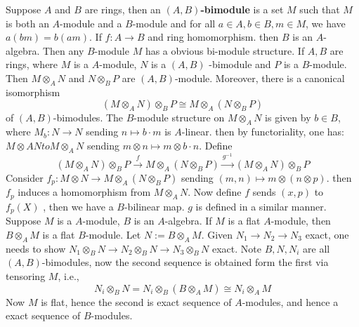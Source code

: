 \documentclass[12pt]{article}
\theoremstyle{definition}
\theoremstyle{plain}
\begin{document}
\medskip
Suppose $A$ and $B$ are rings, then an \textbf{$(A, B)$-bimodule} is a set $M$ such that $M$ is both an $A$-module and a $B$-module and for all $a\in A, b\in B, m\in M$, we have $a(bm)=b(am)$.
\Exe If $f:A\to B$ and ring homomorphism. then $B$ is an $A$-algebra. Then any $B$-module $M$ has a obvious bi-module structure.
\Lemma If $A, B$ are rings, where $M$ is a $A$-module, $N$ is a $(A, B)$ -bimodule and $P$ is a $B$-module. Then $M\otimes_A N$ and $N\otimes_B P$ are $(A, B)$-module. Moreover, there is a canonical isomorphism
$$(M\otimes_A N)\otimes_B P\cong M\otimes_A(N\otimes_B P)$$
of $(A, B)$-bimodules.
\proof The $B$-module structure on $M\otimes_A N$ is given by $b\in B$, where $M_b:N\to N$ sending $n\mapsto b\cdot m$ is $A$-linear. then by functoriality, one has: $M\otimes A N to M\otimes_A N$ sending $m\otimes n\mapsto m\otimes b\cdot n$. Define
$$(M\otimes_A N)\otimes_B P \overset{f}{\to} M\otimes_A(N\otimes_B P)\overset{g^{-1}}{\to} (M\otimes_A N)\otimes_B P$$
Consider $f_p: M\otimes N\to M\otimes_A(N\otimes_B P)$ sending $(m,n)\mapsto m\otimes (n\otimes p)$. then $f_p$ induces a homomorphism from $M\otimes_A N$. Now define $f$ sends $(x, p)$ to $f_p(X)$ , then we have a $B$-bilinear map. $g$ is defined in a similar manner.
 Suppose $M$ is a $A$-module, $B$ is an $A$-algebra. If $M$ is a flat $A$-module, then $B\otimes_A M$ is a flat $B$-module.
\proof Let $N:=B\otimes_A M$. Given $N_1\to N_2\to N_3$ exact, one needs to show $N_1\otimes_B N \to N_2\otimes_B N\to N_3\otimes_B N$ exact. Note $B, N, N_i$ are all $(A, B)$-bimodules, now the second sequence is obtained form the first via tensoring $M$, i.e.,
$$N_i\otimes_B N = N_i\otimes_B (B\otimes_AM)\cong N_i \otimes_A M$$
Now $M$ is flat, hence the second is exact sequence of $A$-modules, and hence a exact sequence of $B$-modules.

\bigskip
\end{document}
